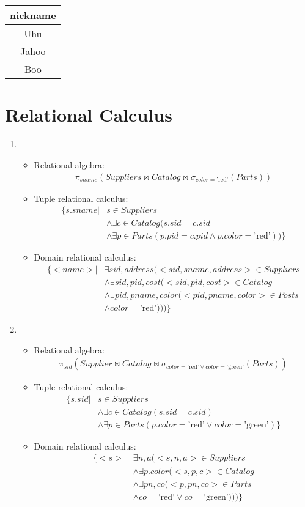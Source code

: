 \subsection{~}

\begin{tabular}{| c |}
\hline 
\textbf{nickname}\\
\hline
Uhu\\
\hline
Jahoo\\
\hline 
Boo\\
\hline
\end{tabular}

\section{Relational Calculus}
{
\newcommand{\solution}[3]{
\item
\begin{itemize}
\item Relational algebra:\begin{align*}#1\end{align*}
\item Tuple relational calculus: \begin{align*}#2\end{align*}
\item Domain relational calculus: \begin{align*}#3\end{align*}
\end{itemize}}
\begin{enumerate}
\solution
{
\pi_{sname}(Suppliers \Join Catalog \Join \sigma_{color=\text{'red'}}(Parts))
}
{
\{s.sname | & s \in Suppliers \\
&\wedge \exists c \in Catalog(s.sid = c.sid\\
&\wedge \exists p \in Parts(p.pid = c.pid \wedge p.color = \text{'red'}) ) \}
}
{
\{<name> | &\exists sid,address(<sid, sname, address> \in Suppliers\\
&\wedge \exists sid,pid,cost(<sid,pid, cost> \in Catalog\\
&\wedge \exists pid, pname, color(<pid,pname,color> \in Posts\\
&\wedge color=\text{'red'}
))) \}
}

\solution
{\pi_{sid}(Supplier \Join Catalog \Join \sigma_{color=\text{'red'} \vee color=\text{'green'}}(Parts))}
{\{
s.sid | & s \in Suppliers\\
&\wedge \exists c \in Catalog(s.sid = c.sid)\\
&\wedge \exists p \in Parts(p.color=\text{'red'} \vee color=\text{'green'})
\}}
{\{
<s> | & \exists n,a (<s,n,a> \in Suppliers\\
&\wedge \exists p.color(<s,p,c> \in Catalog\\
&\wedge \exists pn,co(<p,pn,co> \in Parts\\
&\wedge co=\text{'red'} \vee co=\text{'green'})))
\}}
\end{enumerate}
}
